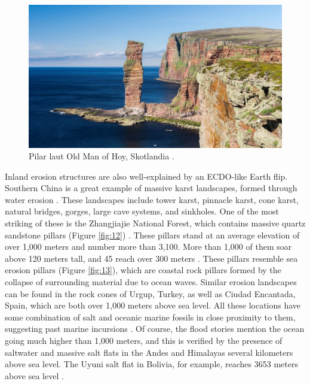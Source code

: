 \documentclass[10pt,twocolumn,letterpaper]{article}
\begin{document}
\begin{figure}[b]
\begin{center}
   \includegraphics[width=1\linewidth]{hoy.jpg}
\end{center}
   \caption{Pilar laut Old Man of Hoy, Skotlandia \cite{83}.}
\label{fig:13}
\label{fig:onecol}
\end{figure}
Inland erosion structures are also well-explained by an ECDO-like Earth flip. Southern China is a great example of massive karst landscapes, formed through water erosion \cite{82}. These landscapes include tower karst, pinnacle karst, cone karst, natural bridges, gorges, large cave systems, and sinkholes. One of the most striking of these is the Zhangjiajie National Forest, which contains massive quartz sandstone pillars (Figure \ref{fig:12}) \cite{84}. These pillars stand at an average elevation of over 1,000 meters and number more than 3,100. More than 1,000 of them soar above 120 meters tall, and 45 reach over 300 meters \cite{85}. These pillars resemble sea erosion pillars (Figure \ref{fig:13}), which are coastal rock pillars formed by the collapse of surrounding material due to ocean waves. Similar erosion landscapes can be found in the rock cones of Urgup, Turkey, as well as Ciudad Encantada, Spain, which are both over 1,000 meters above sea level. All these locations have some combination of salt and oceanic marine fossils in close proximity to them, suggesting past marine incursions \cite{15,86,87}. Of course, the flood stories \cite{3} mention the ocean going much higher than 1,000 meters, and this is verified by the presence of saltwater and massive salt flats in the Andes and Himalayas several kilometers above sea level. The Uyuni salt flat in Bolivia, for example, reaches 3653 meters above sea level \cite{94}.
\end{document}
